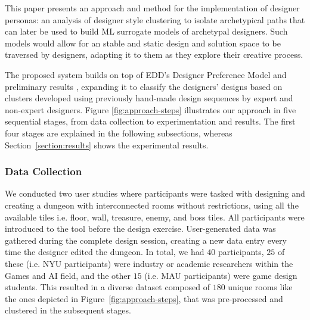 This paper presents an approach and method for the implementation of designer personas: an analysis of designer style clustering to isolate archetypical paths that can later be used to build ML surrogate models of archetypal designers. Such models would allow for an stable and static design and solution space to be traversed by designers, adapting it to them as they explore their creative process.


The proposed system builds on top of EDD's Designer Preference Model and preliminary results \cite{p10Alvarez2020-DesignerPreference}, expanding it to classify the designers' designs based on clusters developed using previously hand-made design sequences by expert and non-expert designers. Figure \ref{fig:approach-steps} illustrates our approach in five sequential stages, from data collection to experimentation and results. The first four stages are explained in the following subsections, whereas Section~\ref{section:results} shows the experimental results.

\subsubsection{Data Collection}

We conducted two user studies where participants were tasked with designing and creating a dungeon with interconnected rooms without restrictions, using all the available tiles i.e. floor, wall, treasure, enemy, and boss tiles. All participants were introduced to the tool before the design exercise. User-generated data was gathered during the complete design session, creating a new data entry every time the designer edited the dungeon. In total, we had $40$ participants, $25$ of these (i.e. NYU participants) were industry or academic researchers within the Games and AI field, and the other $15$ (i.e. MAU participants) were game design students. This resulted in a diverse dataset composed of $180$ unique rooms like the ones depicted in Figure~\ref{fig:approach-steps}, that was pre-processed and clustered in the subsequent stages. 

